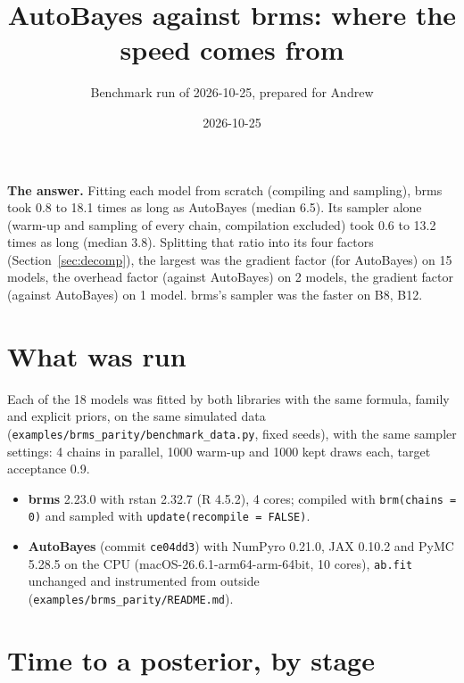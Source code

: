 \documentclass[11pt]{article}
\title{AutoBayes against brms: where the speed comes from}
\author{Benchmark run of 2026-10-25, prepared for Andrew}
\date{2026-10-25}
\newcommand{\code}[1]{\texttt{#1}}
\newcommand{\file}[1]{\texttt{#1}}
\begin{document}
\maketitle

\noindent\textbf{The answer.} Fitting each model from scratch (compiling and sampling), brms took 0.8 to 18.1 times as long as AutoBayes (median 6.5). Its sampler alone (warm-up and sampling of every chain, compilation excluded) took 0.6 to 13.2 times as long (median 3.8). Splitting that ratio into its four factors (Section~\ref{sec:decomp}), the largest was the gradient factor (for AutoBayes) on 15 models, the overhead factor (against AutoBayes) on 2 models, the gradient factor (against AutoBayes) on 1 model. brms's sampler was the faster on B8, B12.

\section{What was run}

Each of the 18 models was fitted by both libraries with the same formula, family and explicit priors, on the same simulated data (\file{examples/brms\_parity/benchmark\_data.py}, fixed seeds), with the same sampler settings: 4 chains in parallel, 1000 warm-up and 1000 kept draws each, target acceptance 0.9.
\begin{itemize}
\item \textbf{brms} 2.23.0 with rstan 2.32.7 (R 4.5.2), 4 cores; compiled with \code{brm(chains = 0)} and sampled with \code{update(recompile = FALSE)}.
\item \textbf{AutoBayes} (commit \code{ce04dd3}) with NumPyro 0.21.0, JAX 0.10.2 and PyMC 5.28.5 on the CPU (macOS-26.6.1-arm64-arm-64bit, 10 cores), \code{ab.fit} unchanged and instrumented from outside (\file{examples/brms\_parity/README.md}).
\end{itemize}

\section{Time to a posterior, by stage}
\end{document}
